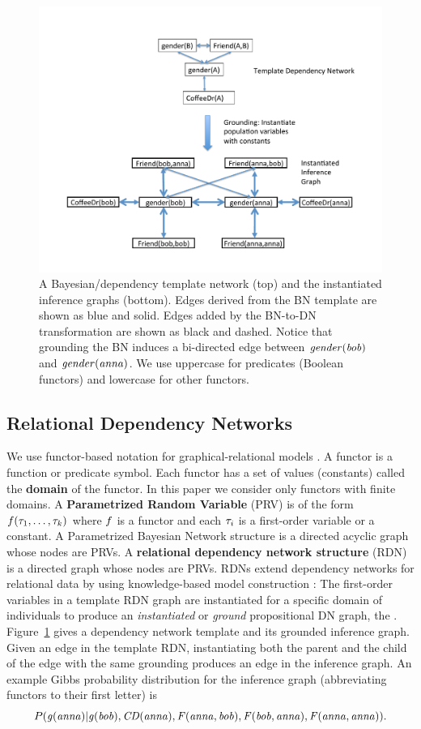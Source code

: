 \documentclass[runningheads,a4paper]{llncs}
\newcommand{\fixneeded}[1]{\textbf{[\footnotesize #1]}}
\begin{document}
\begin{figure}[htbp]
\begin{center}
\includegraphics[width = 0.7 \textwidth]{figures/dn}
\caption{A Bayesian/dependency template network (top) and the instantiated inference graphs (bottom). Edges derived from the BN template are shown as blue and solid. Edges added by the BN-to-DN transformation are shown as black and dashed. Notice that grounding the BN induces a bi-directed edge between $\it{gender}(bob)$ and $\it{gender}(anna)$. \label{fig:dn}
We use uppercase for predicates (Boolean functors) and lowercase for other functors.}
\end{center}
\end{figure}

 
\subsection{Relational Dependency Networks} We use  functor-based notation for graphical-relational models \cite{Poole2003}. A functor is a function or predicate symbol. Each functor has a set of values (constants) called the \textbf{domain} of the functor. In this paper we consider only functors with finite domains. A \textbf{Parametrized Random Variable} (PRV) is of the form $f(\tau_{1},\ldots,\tau_{k})$ where $f$ is a functor 
and each $\tau_{i}$ is a first-order variable or a constant.
 A Parametrized Bayesian Network structure is a directed acyclic graph whose nodes are PRVs. A \textbf{relational dependency network structure} (RDN) is a directed graph whose nodes are PRVs.
RDNs extend dependency networks for relational data by using knowledge-based model construction \cite{Neville2007}:
%
%
 The first-order variables in a template RDN graph are instantiated for a specific domain of individuals to produce an {\em  instantiated} or {\em ground} propositional DN graph, the . Figure~\ref{fig:dn} gives a dependency network template and its grounded inference graph. Given an edge in the template RDN, instantiating both the parent and the child of the edge with the same grounding produces an edge in the inference graph. An example Gibbs probability distribution for the inference graph (abbreviating functors to their first letter) is
$$P(\it{g(anna)}|\it{g(bob)}, \it{CD(anna)}, \it{F(anna,bob)},\it{F(bob,anna)},\it{F(anna,anna)}).$$
\end{document}
